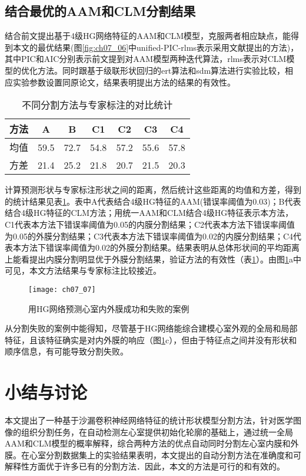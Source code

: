 \subsection{结合最优的AAM和CLM分割结果}
结合前文提出基于4级HG网络特征的AAM和CLM模型，克服两者相应缺点，能得到本文的最优结果(图\ref{fig:ch07_06}中unified-PIC-rlms表示采用文献\citep{Jan2017}提出的方法)，其中PIC和AIC分别表示前文提到对AAM模型两种迭代算法，rlms表示对CLM模型的优化方法。同时跟基于级联形状回归的ert算法\citep{Kazemi2014a}和sdm算法\citep{Xiong2013}进行实验比较，相应实验参数设置同原论文，结果表明提出方法的结果的有效性。

\begin{table}[!htbp]
    \centering
    \footnotesize%
    \setlength{\tabcolsep}{4pt}%
    \renewcommand{\arraystretch}{1.2}%
    \begin{tabular}{lcccccc}
        \cline{1-7}%
         方法  &A  &B &C1 &C2	&C3	&C4 \\
        \hline
        均值	&59.5	&72.7	&54.8	&57.2	&55.6	&57.8 \\
        \hline
        方差	&21.4	&25.2	&21.8	&20.7	&21.5	&20.3\\
        \hline\hline
    \end{tabular}
    \caption{不同分割方法与专家标注的对比统计}
    \label{tab:ch07_01}
\end{table}

计算预测形状与专家标注形状之间的距离，然后统计这些距离的均值和方差，得到的统计结果见表\ref{tab:ch07_01}。表中A代表结合4级HG特征的AAM(错误率阈值为0.03)；B代表结合4级HG特征的CLM方法；用统一AAM和CLM结合4级HG特征表示本方法，C1代表本方法下错误率阈值为0.05的内膜分割结果；C2代表本方法下错误率阈值为0.05的外膜分割结果；C3代表本方法下错误率阈值为0.02的内膜分割结果；C4代表本方法下错误率阈值为0.02的外膜分割结果。结果表明从总体形状间的平均距离上能看提出内膜分割明显优于外膜分割结果，验证方法的有效性（表\ref{tab:ch07_01}）。由图\ref{fig:ch07_07}a中可见，本文方法结果与专家标注比较接近。
\begin{figure}[!htbp]
\centering
\texttt{[image: ch07\_07]}
\caption{用HG网络预测心室内外膜成功和失败的案例}
\label{fig:ch07_07}
\end{figure}   

从分割失败的案例中能得知，尽管基于HG网络能综合建模心室外观的全局和局部特征，且该特征确实是对内外膜的响应（图\ref{fig:ch07_07}c），但由于特征点之间并没有形状和顺序信息，有可能导致分割失败。

\section{小结与讨论}

本文提出了一种基于沙漏卷积神经网络特征的统计形状模型分割方法，针对医学图像的组织分割任务，在自动检测左心室提供初始化轮廓的基础上，通过统一全局AAM和CLM模型的概率解释，综合两种方法的优点自动同时分割左心室内膜和外膜。在心室分割数据集上的实验结果表明，本文提出的自动分割方法在准确度和可解释性方面优于许多已有的分割方法．因此，本文的方法是可行的和有效的。

